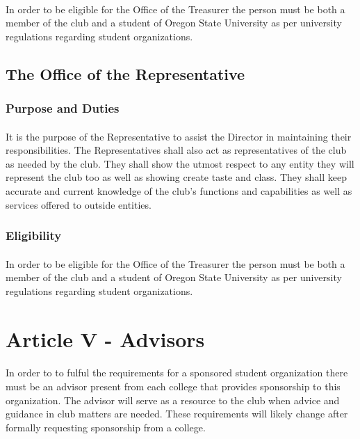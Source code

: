 \documentclass[12pt]{article}
\newcommand{\article}[1]{
\setcounter{section}{0}
\setcounter{subsection}{0}

	\section*{#1}
	\addcontentsline{toc}{section}{#1}
	
}
\begin{document}
\paragraph{}
In order to be eligible for the Office of the Treasurer the person must be both a member of the club and a student of Oregon State University as per university regulations regarding student organizations.

\subsection{The Office of the Representative}
\subsubsection{Purpose and Duties}
\paragraph{}
It is the purpose of the Representative to assist the Director in maintaining their responsibilities. The Representatives shall also act as representatives of the club as needed by the club. They shall show
the utmost respect to any entity they will represent the club too as well as showing create taste and class. They shall keep accurate and current knowledge of the club's functions and capabilities as well
as services offered to outside entities.
\subsubsection{Eligibility}
\paragraph{}
In order to be eligible for the Office of the Treasurer the person must be both a member of the club and a student of Oregon State University as per university regulations regarding student organizations.



\article{Article V - Advisors}
\paragraph{}
In order to to fulful the requirements for a sponsored student organization there must be an advisor present from each college that provides sponsorship to this organization. The advisor will serve as a resource to the club when advice and guidance in club matters are needed. These requirements will likely change after formally requesting sponsorship from a college.
\end{document}
